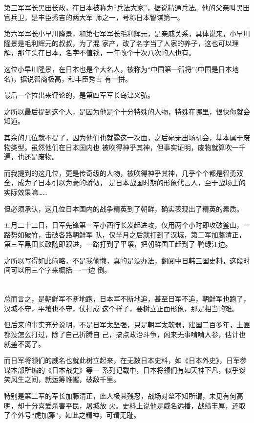 \documentclass[11pt,a4paper,onecolumn]{article}
\begin{document}
第三军军长黑田长政，在日本被称为``兵法大家''，据说精通兵法。他的父亲叫黑田官兵卫，是丰臣秀吉的两大军
师之一，号称日本智谋第一。

第六军军长小早川隆景，和第七军军长毛利辉元，是亲戚关系，具体说来，小早川隆景是毛利辉元的叔叔，为了混
家产，改了名字当了人家的养子，这也可以理解，那年头在日本，名字不值钱，一年改个十次八次的人也有。

这位小早川隆景，在日本也是个大名人，被称为``中国第一智将''(中国是日本地名)，据说智商极高，和丰臣秀吉
有一拼。

最后一个拉出来评论的，是第四军军长岛津义弘。

之所以最后提到这个人，是因为他是个十分特殊的人物，特殊在哪里，很快你就会知道。

其余的几位就不提了，因为他们也就露这一次面，之后毫无出场机会，基本属于废物类型。虽然他们在日本国内也
被吹得神乎其神，但事实证明，废物就算吹一千遍，也还是废物。

而我提到的这几位，更是传奇级的人物，被吹得神乎其神，几乎个个都是智勇双全，成为了日本引以为豪的骄傲，
是日本战国时期的形象代言人，至于战场上的实际效果嘛……

但必须承认，这几位日本国内的战争精英到了朝鲜，确实表现出了精英的素质。

五月二十二日，日军先锋第一军小西行长发起进攻，仅用两个小时即攻破釜山，一路势如破竹，击破各路朝鲜军
队，仅半月之后就打到了汉城，第二军加藤清正，第三军黑田长政随即跟进，一路打到了平壤，把朝鲜国王赶到了
鸭绿江边。

之所以写得如此简略，不是我偷懒，真的是没办法，翻阅中日韩三国史料，这段时间可以用三个字来概括----一边
倒。

\section[\thesection]{}

总而言之，是朝鲜军不断地跑，日本军不断地追，甚至日军不追，朝鲜军也跑了，汉城不守，平壤也不守，仗打成
这个样子，要树立正面形象，那是相当的难。

但后来的事实充分说明，不是日军太坚强，只是朝军太软弱，建国二百多年，土匪都没怎么打过，除了自己折腾自
己，搞点政治斗争，闲来无事啃啃人参，估计也就差不离了。

而日军将领们的威名也就此树立起来，在无数日本史料，如《日本外史》，日军参谋本部所编的《日本战史》等一
系列记载中，日本将领们有如天神下凡，似乎谈笑风生之间，就运筹帷幄，破敌千里。

特别是第二军的军长加藤清正，此人极其残忍，战场对垒不知所谓，未见有何高明，却十分喜爱杀害平民，屠城放
火。史料上说他是威名远播，战绩丰厚，还取了个外号``虎加藤''，如此之精神，可谓无耻。
\end{document}

